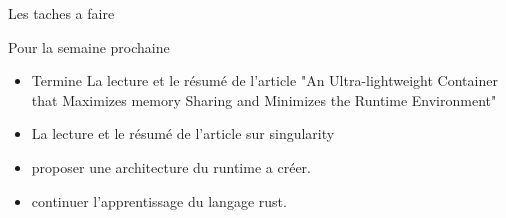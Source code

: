 \documentclass[9pt]{beamer}
\begin{document}
\begin{frame}{Les taches a faire}

Pour la semaine prochaine
    \begin{itemize}[<+->]
        \vspace{5mm}
        \item  Termine La lecture et le résumé de l'article "An Ultra-lightweight Container that Maximizes memory Sharing and Minimizes the Runtime Environment"         
        \vspace{5mm}
        \item La lecture et le résumé de l'article sur singularity
        \vspace{5mm}
        \item proposer une architecture du runtime a créer. 
        \vspace{5mm}
        \item continuer l'apprentissage du langage rust. 
    \end{itemize}
\end{frame}
\end{document}
